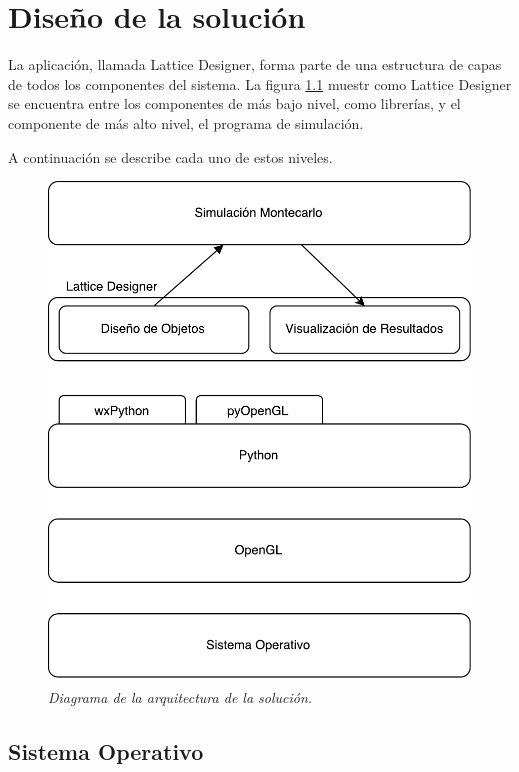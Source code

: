 \chapter{Diseño de la solución}
\label{cap:diseno}

La aplicación, llamada Lattice Designer, forma parte de una estructura de capas de todos los componentes del sistema. La figura \ref{arquitectura} muestr como Lattice Designer se encuentra entre los componentes de más bajo nivel, como librerías, y el componente de más alto nivel, el programa de simulación.

A continuación se describe cada uno de estos niveles.

\begin{figure}[ht]
  \centering
  \includegraphics[scale=.7]{images/arquitectura}
  \caption{\em Diagrama de la arquitectura de la solución.}
  \label{arquitectura}
\end{figure}

\section{Sistema Operativo}

